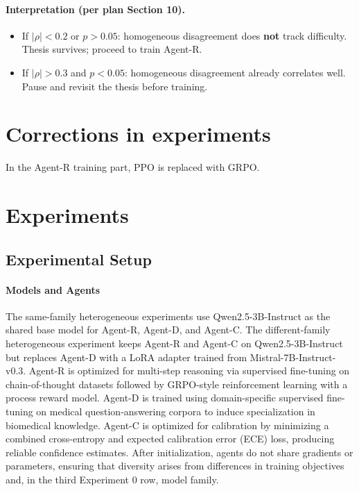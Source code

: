 \documentclass{article}
\begin{document}
\paragraph{Interpretation (per plan Section 10).}
\begin{itemize}
    \item If $|\rho| < 0.2$ or $p > 0.05$: homogeneous disagreement does \textbf{not} track difficulty. Thesis survives; proceed to train Agent-R.
    \item If $|\rho| > 0.3$ and $p < 0.05$: homogeneous disagreement already correlates well. Pause and revisit the thesis before training.
\end{itemize}
\section{Corrections in experiments}
In the Agent-R training part, PPO is replaced with GRPO.
\section{Experiments}

\subsection{Experimental Setup}

\paragraph{Models and Agents}
The same-family heterogeneous experiments use Qwen2.5-3B-Instruct as the shared base model for Agent-R, Agent-D, and Agent-C. The different-family heterogeneous experiment keeps Agent-R and Agent-C on Qwen2.5-3B-Instruct but replaces Agent-D with a LoRA adapter trained from Mistral-7B-Instruct-v0.3. Agent-R is optimized for multi-step reasoning via supervised fine-tuning on chain-of-thought datasets followed by GRPO-style reinforcement learning with a process reward model. Agent-D is trained using domain-specific supervised fine-tuning on medical question-answering corpora to induce specialization in biomedical knowledge. Agent-C is optimized for calibration by minimizing a combined cross-entropy and expected calibration error (ECE) loss, producing reliable confidence estimates. After initialization, agents do not share gradients or parameters, ensuring that diversity arises from differences in training objectives and, in the third Experiment 0 row, model family.
\end{document}
